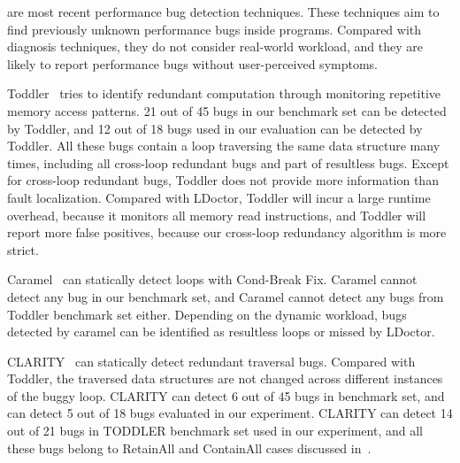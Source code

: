 {\color{red}
\cite{Alabama, CARAMEL, IsilDillig.PLDI15} are most recent performance bug detection techniques. 
These techniques aim to find previously unknown performance bugs inside programs. 
Compared with diagnosis techniques, they do not consider real-world workload, 
and they are likely to report performance bugs without user-perceived symptoms. 

Toddler~\cite{Alabama} tries to identify redundant computation through monitoring repetitive memory access patterns. 
21 out of 45 bugs in our benchmark set can be detected by Toddler, 
and 12 out of 18 bugs used in our evaluation can be detected by Toddler. 
All these bugs contain a loop traversing the same data structure many times, 
including all cross-loop redundant bugs and part of resultless bugs. 
Except for cross-loop redundant bugs, Toddler does not provide more information than fault localization. 
Compared with LDoctor, Toddler will incur a large runtime overhead, 
because it monitors all memory read instructions, 
and Toddler will report more false positives, because our cross-loop redundancy algorithm is more strict. 

Caramel~\cite{CARAMEL} can statically detect loops with Cond-Break Fix. 
Caramel cannot detect any bug in our benchmark set, 
and Caramel cannot detect any bugs from Toddler benchmark set either. 
Depending on the dynamic workload, bugs detected by caramel can be identified as resultless loops or missed by LDoctor. 

CLARITY~\cite{IsilDillig.PLDI15} can statically detect redundant traversal bugs. 
Compared with Toddler, the traversed data structures are not changed across different instances of the buggy loop. 
CLARITY can detect 6 out of 45 bugs in benchmark set, and can detect 5 out of 18 bugs evaluated in our experiment. 
CLARITY can detect 14 out of 21 bugs in TODDLER benchmark set used in our experiment, 
and all these bugs belong to RetainAll and ContainAll cases discussed in~\cite{IsilDillig.PLDI15}.
}